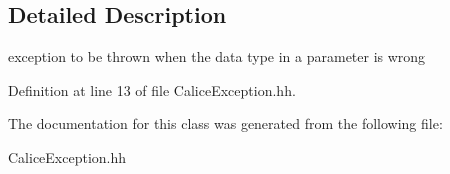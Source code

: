 \subsection{Detailed Description}
exception to be thrown when the data type in a parameter is wrong 



Definition at line 13 of file Calice\-Exception.\-hh.



The documentation for this class was generated from the following file\-:\begin{DoxyCompactItemize}
\item 
Calice\-Exception.\-hh\end{DoxyCompactItemize}
